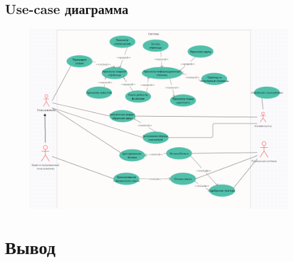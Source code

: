 \documentclass{article}
\begin{document}
\subsection{Use-case диаграмма}
\begin{figure}[h]
  \includegraphics[width=\textwidth]{use-case-diagram/Use-case.png}
  \centering
\end{figure}

\section{Вывод}


\end{document}
